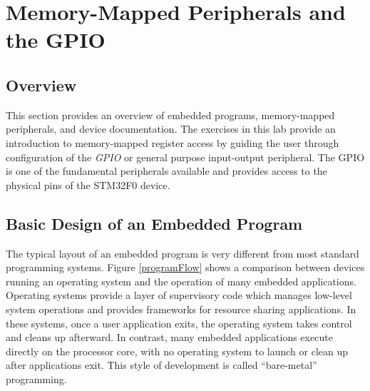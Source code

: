 \documentclass[11pt,fleqn]{book} %
\begin{document}



\chapter{Memory-Mapped Peripherals and the GPIO}

\section{Overview}
This section provides an overview of embedded programs, memory-mapped peripherals, and device documentation. The exercises in this lab provide an introduction to memory-mapped register access by guiding the user through configuration of the \textit{GPIO} or general purpose input-output peripheral. The GPIO is one of the fundamental peripherals available and provides access to the physical pins of the STM32F0 device. 


\section{Basic Design of an Embedded Program}


The typical layout of an embedded program is very different from most standard programming systems. Figure \ref{programFlow} shows a comparison between devices running an operating system and the operation of many embedded applications. 
Operating systems provide a layer of supervisory code which manages low-level system operations and provides frameworks for resource sharing applications. In these systems, once a user application exits, the operating system takes control and cleans up afterward. In contrast, many embedded applications execute directly on the processor core, with no operating system to launch or clean up after applications exit. This style of development is called ``bare-metal'' programming. 
\end{document}
